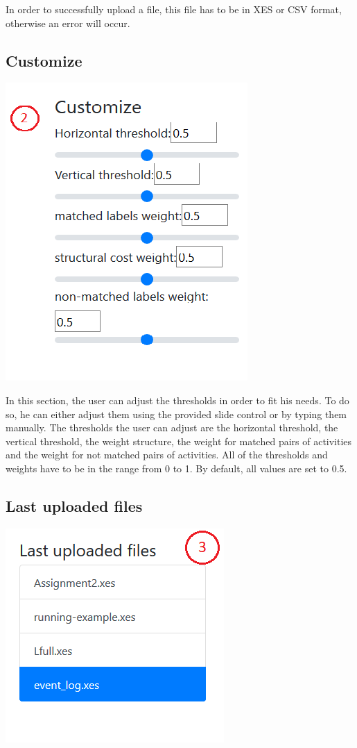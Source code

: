 \documentclass[notitlepage]{article}
\begin{document}
In order to successfully upload a file, this file has to be in XES or CSV format, otherwise an error will occur. 



\subsection{Customize}

\includegraphics[scale=0.6]{customize.png}

In this section, the user can adjust the thresholds in order to fit his needs. 
To do so, he can either adjust them using the provided slide control or by typing them manually. 
The thresholds the user can adjust are the horizontal threshold, the vertical threshold, the weight structure, the weight for matched pairs of activities and the weight for not matched pairs of activities. 
All of the thresholds and weights have to be in the range from 0 to 1.
By default, all values are set to 0.5.

\subsection{Last uploaded files}

\includegraphics[scale=0.6]{lastUploadedFiles.png}
\end{document}
